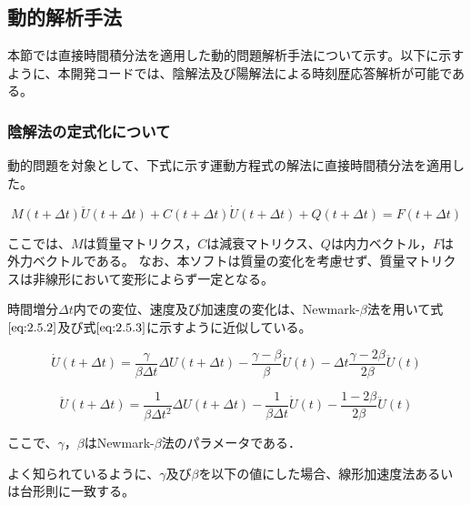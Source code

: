 \documentclass[a4paper,pandoc,ja=standard]{bxjsarticle}
\begin{document}
\hypertarget{ux52d5ux7684ux89e3ux6790ux624bux6cd5}{%
\subsection{動的解析手法}\label{ux52d5ux7684ux89e3ux6790ux624bux6cd5}}

本節では直接時間積分法を適用した動的問題解析手法について示す。以下に示すように、本開発コードでは、陰解法及び陽解法による時刻歴応答解析が可能である。

\hypertarget{ux9670ux89e3ux6cd5ux306eux5b9aux5f0fux5316ux306bux3064ux3044ux3066}{%
\subsubsection{陰解法の定式化について}\label{ux9670ux89e3ux6cd5ux306eux5b9aux5f0fux5316ux306bux3064ux3044ux3066}}

動的問題を対象として、下式に示す運動方程式の解法に直接時間積分法を適用した。

\begin{equation}
M( t + \Delta t ) \ddot{U} (t + \Delta t) + C( t + \Delta t ) \dot{U}(t + \Delta t) + Q( t + \Delta t ) = F( t + \Delta t )
\label{eq:2.5.1}
\end{equation}

ここでは、\(M\)は質量マトリクス，\(C\)は減衰マトリクス、\(Q\)は内力ベクトル，\(F\)は外力ベクトルである。
なお、本ソフトは質量の変化を考慮せず、質量マトリクスは非線形において変形によらず一定となる。

時間増分\(\Delta t\)内での変位、速度及び加速度の変化は、Newmark-\(\beta\)法を用いて式\(\eqref{eq:2.5.2}\)及び式\(\eqref{eq:2.5.3}\)に示すように近似している。

\begin{equation}
\dot{U}(t + \Delta t) =
\frac{\gamma}{\beta \Delta t} \Delta U( t + \Delta t ) - \frac{\gamma - \beta}{\beta} \dot{U}( t ) - \Delta t \frac{\gamma - 2\beta}{2\beta} \ddot{U}(t)
\label{eq:2.5.2}
\end{equation}

\begin{equation}
\ddot{U}(t + \Delta t) = \frac{1}{\beta \Delta t^2}\Delta U(t + \Delta t) - \frac{1}{\beta \Delta t} \dot{U}(t) - \frac{1 - 2\beta}{2\beta} \ddot {U}(t)
\label{eq:2.5.3}
\end{equation}

ここで、\(\gamma\)，\(\beta\)はNewmark-\(\beta\)法のパラメータである．

よく知られているように、\(\gamma\)及び\(\beta\)を以下の値にした場合、線形加速度法あるいは台形則に一致する。
\end{document}
